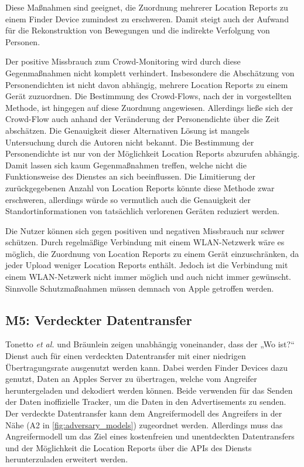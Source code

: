 Diese Maßnahmen sind geeignet, die Zuordnung mehrerer Location Reports zu einem Finder Device zumindest zu erschweren.
Damit steigt auch der Aufwand für die Rekonstruktion von Bewegungen und die indirekte Verfolgung von Personen.

Der positive Missbrauch zum Crowd-Monitoring wird durch diese Gegenmaßnahmen nicht komplett verhindert.
Insbesondere die Abschätzung von Personendichten ist nicht davon abhängig, mehrere Location Reports zu einem Gerät zuzuordnen.
Die Bestimmung des Crowd-Flows, nach der in \cite{Tonetto_FindMy} vorgestellten Methode, ist hingegen auf diese Zuordnung angewiesen.
Allerdings ließe sich der Crowd-Flow auch anhand der Veränderung der Personendichte über die Zeit abschätzen.
Die Genauigkeit dieser Alternativen Lösung ist mangels Untersuchung durch die Autoren nicht bekannt.
Die Bestimmung der Personendichte ist nur von der Möglichkeit Location Reports abzurufen abhängig.
Damit lassen sich kaum Gegenmaßnahmen treffen, welche nicht die Funktionsweise des Dienstes an sich beeinflussen.
Die Limitierung der zurückgegebenen Anzahl von Location Reports könnte diese Methode zwar erschweren, allerdings würde so vermutlich auch die Genauigkeit der Standortinformationen von tatsächlich verlorenen Geräten reduziert werden.

Die Nutzer können sich gegen positiven und negativen Missbrauch nur schwer schützen.
Durch regelmäßige Verbindung mit einem WLAN-Netzwerk wäre es möglich, die Zuordnung von Location Reports zu einem Gerät einzuschränken, da jeder Upload weniger Location Reports enthält.
Jedoch ist die Verbindung mit einem WLAN-Netzwerk nicht immer möglich und auch nicht immer gewünscht.
Sinnvolle Schutzmaßnahmen müssen demnach von Apple getroffen werden.


\subsection[M5]{M5: Verdeckter Datentransfer}
\label{missbrauch:5}
Tonetto \textit{et al.} \cite{Tonetto_FindMy} und Bräunlein \cite{braeunlein_sendmy} zeigen unabhängig voneinander, dass der „Wo ist?“ Dienst auch für einen verdeckten Datentransfer mit einer niedrigen Übertragungsrate ausgenutzt werden kann.
Dabei werden Finder Devices dazu genutzt, Daten an Apples Server zu übertragen, welche vom Angreifer heruntergeladen und dekodiert werden können.
Beide verwenden für das Senden der Daten inoffizielle Tracker, um die Daten in den Advertisements zu senden.
Der verdeckte Datentransfer kann dem Angreifermodell des Angreifers in der Nähe (A2 in \autoref{fig:adversary_models}) zugeordnet werden.
Allerdings muss das Angreifermodell um das Ziel eines kostenfreien und unentdeckten Datentransfers und der Möglichkeit die Location Reports über die \acp{API} des Diensts herunterzuladen erweitert werden.


